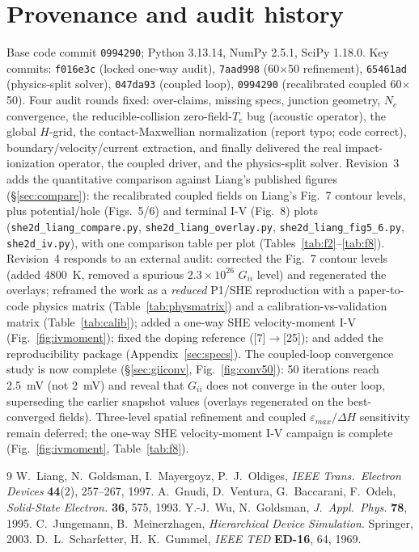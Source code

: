 \documentclass[11pt]{article}
\newcommand{\eps}{\varepsilon}
\begin{document}
\section{Provenance and audit history}\label{sec:history}
Base code commit \texttt{0994290}; Python 3.13.14, NumPy 2.5.1, SciPy 1.18.0. Key commits:
\texttt{f016e3c} (locked one-way audit), \texttt{7aad998} (60$\times$50 refinement),
\texttt{65461ad} (physics-split solver), \texttt{047da93} (coupled loop), \texttt{0994290}
(recalibrated coupled 60$\times$50). Four audit rounds fixed:
over-claims, missing specs, junction geometry, $N_c$ convergence, the reducible-collision
zero-field-$T_e$ bug (acoustic operator), the global $H$-grid, the contact-Maxwellian
normalization (report typo; code correct), boundary/velocity/current extraction, and finally
delivered the real impact-ionization operator, the coupled driver, and the physics-split solver.
Revision~3 adds the quantitative comparison against Liang's published figures
(\S\ref{sec:compare}): the recalibrated coupled fields on Liang's Fig.~7 contour levels, plus
potential/hole (Figs.~5/6) and terminal I-V (Fig.~8) plots
(\texttt{she2d\_liang\_compare.py}, \texttt{she2d\_liang\_overlay.py},
\texttt{she2d\_liang\_fig5\_6.py}, \texttt{she2d\_iv.py}), with one comparison table per plot
(Tables~\ref{tab:f2}--\ref{tab:f8}).
Revision~4 responds to an external audit: corrected the Fig.~7 contour levels (added \SI{4800}{K},
removed a spurious $2.3\times10^{26}$ $G_{ii}$ level) and regenerated the overlays; reframed the
work as a \emph{reduced} P1/SHE reproduction with a paper-to-code physics matrix
(Table~\ref{tab:physmatrix}) and a calibration-vs-validation matrix (Table~\ref{tab:calib});
added a one-way SHE velocity-moment I-V (Fig.~\ref{fig:ivmoment}); fixed the doping reference
([7]$\to$[25]); and added the reproducibility package (Appendix~\ref{sec:specs}). The coupled-loop convergence study is
now complete (\S\ref{sec:giiconv}, Fig.~\ref{fig:conv50}): 50 iterations reach \SI{2.5}{mV} (not
\SI{2}{mV}) and reveal that $G_{ii}$ does not converge in the outer loop, superseding the earlier
snapshot values (overlays regenerated on the best-converged fields). Three-level spatial refinement
and coupled $\eps_{max}/\Delta H$ sensitivity remain deferred; the one-way SHE velocity-moment I-V
campaign is complete (Fig.~\ref{fig:ivmoment}, Table~\ref{tab:f8}).

\begin{thebibliography}{9}\small
{} W.~Liang, N.~Goldsman, I.~Mayergoyz, P.~J.~Oldiges, \emph{IEEE Trans.\ Electron
Devices} \textbf{44}(2), 257--267, 1997.
 A.~Gnudi, D.~Ventura, G.~Baccarani, F.~Odeh, \emph{Solid-State Electron.}
\textbf{36}, 575, 1993.
 Y.-J.~Wu, N.~Goldsman, \emph{J.\ Appl.\ Phys.} \textbf{78}, 1995.
 C.~Jungemann, B.~Meinerzhagen, \emph{Hierarchical Device Simulation}.
Springer, 2003.
 D.~L.~Scharfetter, H.~K.~Gummel, \emph{IEEE TED} \textbf{ED-16}, 64, 1969.
\end{thebibliography}
\end{document}
